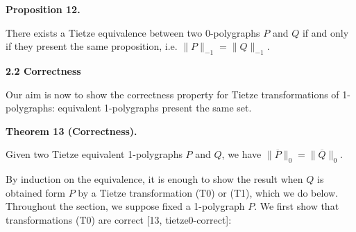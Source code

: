 \documentclass[10pt,a4paper]{amsart}
\begin{document}
 
 
\par\medskip\noindent\textbf{Proposition 12.}\par
 
 
There exists a Tietze equivalence between two 0-polygraphs $P$ and $Q$ if and only if they present the same proposition, i.e. $\|P\|_{-1}=\|Q\|_{-1}$.\par
 
 
 
 
 
 
\par\medskip\noindent\textbf{2.2 Correctness}\par
 
 
Our aim is now to show the correctness property for Tietze transformations of 1-polygraphs: equivalent 1-polygraphs present the same set.\par
 

 
\par\medskip\noindent\textbf{Theorem 13 (Correctness).}\par
 
 
Given two Tietze equivalent 1-polygraphs $P$ and $Q$, we have $\|\overline{P}\|_{0}=\|\overline{Q}\|_{0}$.\par
 
 

 
By induction on the equivalence, it is enough to show the result when $Q$ is obtained form $P$ by a Tietze transformation (T0) or (T1), which we do below. Throughout the section, we suppose fixed a 1-polygraph $P$. We first show that transformations (T0) are correct [13, tietze0-correct]:\par
 
 
 
\end{document}
